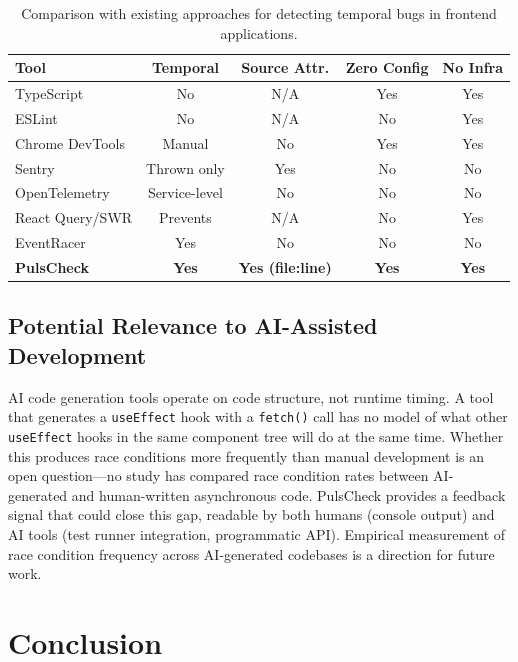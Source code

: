\documentclass[11pt,a4paper]{article}
\begin{document}
\begin{table}[h]
\centering
\small
\begin{tabular}{lcccc}
\toprule
\textbf{Tool} & \textbf{Temporal} & \textbf{Source Attr.} & \textbf{Zero Config} & \textbf{No Infra} \\
\midrule
TypeScript & No & N/A & Yes & Yes \\
ESLint & No & N/A & No & Yes \\
Chrome DevTools & Manual & No & Yes & Yes \\
Sentry & Thrown only & Yes & No & No \\
OpenTelemetry & Service-level & No & No & No \\
React Query/SWR & Prevents & N/A & No & Yes \\
EventRacer & Yes & No & No & No \\
\textbf{PulsCheck} & \textbf{Yes} & \textbf{Yes (file:line)} & \textbf{Yes} & \textbf{Yes} \\
\bottomrule
\end{tabular}
\caption{Comparison with existing approaches for detecting temporal bugs in frontend applications.}
\label{tab:comparison}
\end{table}

\subsection{Potential Relevance to AI-Assisted Development}

AI code generation tools operate on code structure, not runtime timing. A tool that generates a \texttt{useEffect} hook with a \texttt{fetch()} call has no model of what other \texttt{useEffect} hooks in the same component tree will do at the same time. Whether this produces race conditions more frequently than manual development is an open question---no study has compared race condition rates between AI-generated and human-written asynchronous code. PulsCheck provides a feedback signal that could close this gap, readable by both humans (console output) and AI tools (test runner integration, programmatic API). Empirical measurement of race condition frequency across AI-generated codebases is a direction for future work.

\section{Conclusion}
\end{document}
